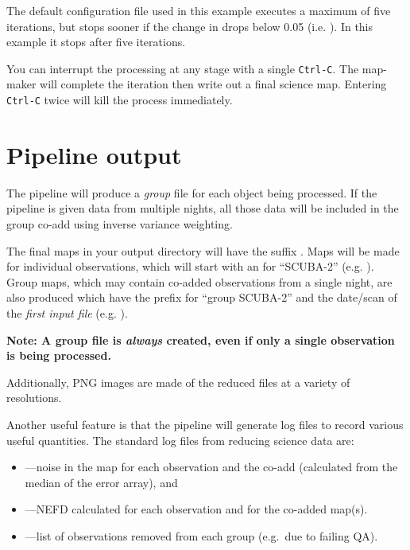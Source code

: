 The default configuration file used in this example executes a maximum
of five iterations, but stops sooner if the change in 
drops below 0.05 (i.e. ). In this example it
stops after five iterations.



\begin{tip}
  You can interrupt the processing at any stage with a single
  \texttt{Ctrl-C}. The map-maker will complete the iteration then
  write out a final science map. Entering \texttt{Ctrl-C} twice will
  kill the process immediately.
\end{tip}

\section{Pipeline output}

The pipeline will produce a \textit{group} file for each object being
processed. If the pipeline is given data from multiple nights, all
those data will be included in the group co-add using inverse variance
weighting.

The final maps in your output directory will have the suffix
. Maps will be made for individual observations, which
will start with an  for ``SCUBA-2'' (e.g.
). Group maps, which may
contain co-added observations from a single night, are also produced
which have the prefix  for ``group SCUBA-2'' and the date/scan 
of the \textit{first input file}
(e.g. ).

\textbf{Note: A group file is \emph{always} created, even if only a
single observation is being processed.}

Additionally, PNG images are made of the reduced files at a variety of
resolutions.

Another useful feature is that the pipeline will generate log files
to record various useful quantities. The standard log files from
reducing science data are:

\begin{itemize}
\item {}---noise in the map for each observation and the co-add
(calculated from the median of the error array), and
\item {}---NEFD calculated for each observation and for
the co-added map(s).
\item {}---list of observations removed from each
  group (e.g.~due to failing QA).
\end{itemize}

